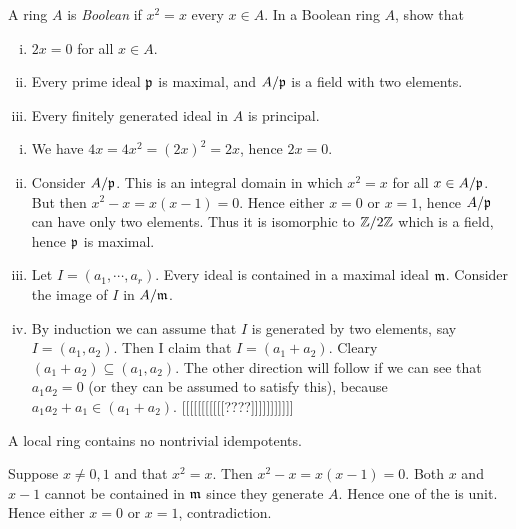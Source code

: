\documentclass[11pt, english]{article}
\begin{document}
\begin{exc}[Exercise 11]
A ring $A$ is \emph{Boolean} if $x^2=x$ every $x \in A$. In a Boolean ring $A$, show that
\begin{enumerate}[i)]
\item $2x=0$ for all $x \in A$.
\item Every prime ideal $\mathfrak{p}$ is maximal, and $A/\mathfrak{p}$ is a field with two elements.
\item Every finitely generated ideal in $A$ is principal.
\end{enumerate}
\end{exc}
\begin{sol}
  \begin{enumerate}[i)]
  \item We have $4x=4x^2=(2x)^2=2x$, hence $2x=0$.
\item Consider $A/\mathfrak{p}$. This is an integral domain in which $x^2=x$ for all $x \in A/\mathfrak{p}$. But then $x^2-x=x(x-1)=0$. Hence either $x=0$ or $x=1$, hence $A/\mathfrak{p}$ can have only two elements. Thus it is isomorphic to $\mathbb{Z}/2\mathbb{Z}$ which is a field, hence $\mathfrak{p}$ is maximal.
\item Let $I=(a_1,\cdots,a_r)$. Every ideal is contained in a maximal ideal $\mathfrak{m}$. Consider the image of $I$ in $A/\mathfrak{m}$. 
\item By induction we can assume that $I$ is generated by two elements, say $I=(a_1,a_2)$. Then I claim that $I=(a_1+a_2)$. Cleary $(a_1+a_2) \subseteq (a_1,a_2)$. The other direction will follow if we can see that $a_1a_2=0$ (or they can be assumed to satisfy this), because $a_1a_2+a_1 \in (a_1+a_2)$.  [[[[[[[[[[[????]]]]]]]]]]]
\end{enumerate}
\end{sol}

\begin{exc}[Exercise 12]
A local ring contains no nontrivial idempotents.  
\end{exc}
\begin{sol}
Suppose $x \neq 0,1$ and that $x^2=x$. Then $x^2-x=x(x-1)=0$. Both $x$ and $x-1$ cannot be contained in $\mathfrak{m}$ since they generate $A$. Hence one of the is unit. Hence either $x=0$ or $x=1$, contradiction. 
\end{sol}
\end{document}
